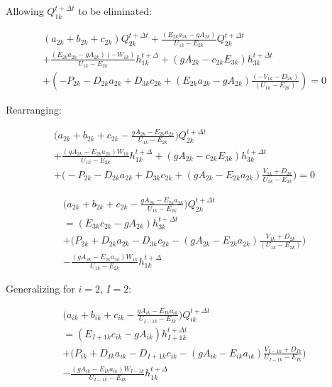 \documentclass[11pt]{article}
\begin{document}
Allowing $Q_{1k}^{t + \Delta t}$ to be eliminated:

\begin{equation}
  \begin{split}
    (a_{2k} + b_{2k} + c_{2k})  Q_{2k}^{t + \Delta t} + \frac{(E_{2k} a_{2k} - g A_{2k})}{U_{1k} - E_{2k}} Q_{2k}^{t + \Delta t} \\ + \frac{(E_{2k} a_{2k} - g A_{2k}) ( - W_{1k} )}{U_{1k} - E_{2k}} h_{1k}^{t + \Delta} + (g A_{2k} - c_{2k} E_{3k}) h_{3k}^{t + \Delta t}   
   \\ + (- P_{2k} - D_{2k} a_{2k}   + D_{3k} c_{2k} + (E_{2k} a_{2k} - g A_{2k}) \frac{ ( - V_{1k} - D_{2k} )}{( U_{1k} - E_{2k} )} ) = 0 
  \end{split}
\end{equation}

Rearranging:

\begin{equation}
  \begin{split}
    \biggl( a_{2k} + b_{2k} + c_{2k} - \frac{g A_{2k} - E_{2k} a_{2k}}{U_{1k} - E_{2k}} \biggr)  Q_{2k}^{t + \Delta t} \\ + \frac{(g A_{2k} - E_{2k} a_{2k}) W_{1k} }{U_{1k} - E_{2k}} h_{1k}^{t + \Delta} + (g A_{2k} - c_{2k} E_{3k}) h_{3k}^{t + \Delta t}   
   \\ + \biggl(- P_{2k} - D_{2k} a_{2k}   + D_{3k} c_{2k} + (g A_{2k} - E_{2k} a_{2k}) \frac{ V_{1k} + D_{2k} }{ U_{1k} - E_{2k} } \biggr) = 0 
  \end{split}
\end{equation}

\begin{equation}
  \begin{split}
    \biggl( a_{2k} + b_{2k} + c_{2k} - \frac{g A_{2k} - E_{2k} a_{2k}}{U_{1k} - E_{2k}} \biggr)  Q_{2k}^{t + \Delta t} \\ =  ( E_{3k} c_{2k} - g A_{2k}) h_{3k}^{t + \Delta t}   
   \\ + \biggl( P_{2k} + D_{2k} a_{2k}   - D_{3k} c_{2k} - (g A_{2k} - E_{2k} a_{2k}) \frac{ V_{1k} + D_{2k} }{( U_{1k} - E_{2k} )} \biggr) \\ - \frac{(g A_{2k} - E_{2k} a_{2k}) W_{1k} }{U_{1k} - E_{2k}} h_{1k}^{t + \Delta} 
  \end{split}
\end{equation}

Generalizing for $i = 2$, $I = 2$:

\begin{equation}
  \begin{split}
    \biggl( a_{ik} + b_{ik} + c_{ik} - \frac{g A_{ik} - E_{Ik} a_{ik}}{U_{I - 1k} - E_{Ik}} \biggr)  Q_{ik}^{t + \Delta t} \\ =  ( E_{I + 1k} c_{ik} - g A_{ik}) h_{I + 1k}^{t + \Delta t}   
   \\ + \biggl( P_{ik} + D_{Ik} a_{ik}   - D_{I+1k} c_{ik} - (g A_{ik} - E_{ik} a_{ik}) \frac{ V_{I-1k} + D_{Ik} }{ U_{I-1k} - E_{Ik} } \biggr) \\ - \frac{(g A_{ik} - E_{Ik} a_{ik}) W_{I - 1k} }{U_{I - 1k} - E_{Ik}} h_{1k}^{t + \Delta} 
  \end{split}
\end{equation}
\end{document}

